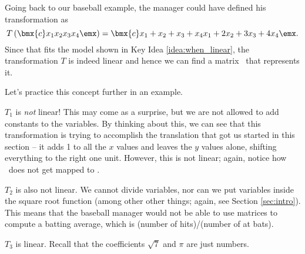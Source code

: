 \smallskip

Going back to our baseball example, the manager could have defined his transformation as 
\[
T\left(\bmx{c}x_1\\x_2\\x_3\\x_4\emx\right) = \bmx{c}x_1+x_2+x_3+x_4 \\ x_1+2x_2+3x_3+4x_4\emx.
\]
Since that fits the model shown in Key Idea \ref{idea:when_linear}, the transformation $T$ is indeed linear and hence we can find a matrix \TT\ that represents it.

Let's practice this concept further in an example.

\medskip

{$T_1$ is \textit{not} linear! This may come as a surprise, but we are not allowed to add constants to the variables. By thinking about this, we can see that this transformation is trying to accomplish the translation that got us started in this section -- it adds 1 to all the $x$ values and leaves the $y$ values alone, shifting everything to the right one unit. However, this is not linear; again, notice how \zero\ does not get mapped to \zero.

$T_2$ is also not linear. We cannot divide variables, nor can we put variables inside the square root function (among other other things; again, see Section \ref{sec:intro}). This means that the baseball manager would not be able to use matrices to compute a batting average, which is (number of hits)/(number of at bats).

$T_3$ is linear. Recall that the coefficients $\sqrt{7}$ and $\pi$ are just numbers.
}

\medskip





